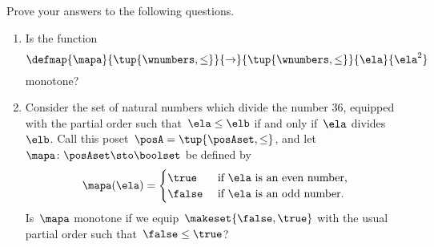 \clearpage
\vfill
\begin{gradedexercise}
    \label{ex:MonotoneMapCheck?}

    Prove your answers to the following questions.
    \begin{enumerate}
        \item Is the function
              \begin{equation}
                  \defmap{\mapa}{\tup{\wnumbers, \leq}}{\to}{\tup{\wnumbers, \leq}}{\ela}{\ela^2}
              \end{equation}
              monotone?
        \item Consider the set of natural numbers which divide the number 36, equip\-ped with the partial order such that~$\ela \leq \elb$ if and only if~$\ela$ divides~$\elb$.
              Call this poset~$\posA = \tup{\posAset, \leq}$, and let~$\mapa \colon \posAset \sto \boolset$ be defined by
              \begin{equation}
                  \mapa(\ela) =
                  \begin{cases}
                      \true  & \text{ if } \ela \text{ is an even number, } \\
                      \false & \text{ if } \ela \text{ is an odd number.
                      }
                  \end{cases}
              \end{equation}
              Is~$\mapa$ monotone if we equip~$\makeset{\false, \true}$ with the usual partial order such that~$\false \leq \true$?
    \end{enumerate}
\end{gradedexercise}

